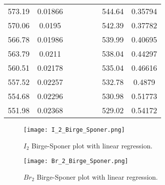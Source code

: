 \documentclass[letterpaper,12pt]{article}
\begin{document}
\begin{table}[!h]
\begin{tabular}{cccccccc}
\rowcolor[HTML]{EFEFEF} 
573.19                   & 0.01866                &                          &                          &                        &                          & 544.64                  & 0.35794                  \\
\rowcolor[HTML]{EFEFEF} 
570.06                   & 0.0195                 &                          &                          &                        &                          & 542.39                  & 0.37782                  \\
\rowcolor[HTML]{EFEFEF} 
566.78                   & 0.01986                &                          &                          &                        &                          & 539.99                  & 0.40695                  \\
\rowcolor[HTML]{EFEFEF} 
563.79                   & 0.0211                 &                          &                          &                        &                          & 538.04                  & 0.44297                  \\
\rowcolor[HTML]{EFEFEF} 
560.51                   & 0.02178                &                          &                          &                        &                          & 535.04                  & 0.46616                  \\
\rowcolor[HTML]{EFEFEF} 
557.52                   & 0.02257                &                          &                          &                        &                          & 532.78                  & 0.4879                   \\
\rowcolor[HTML]{EFEFEF} 
554.68                   & 0.02296                &                          &                          &                        &                          & 530.98                  & 0.51773                  \\
\rowcolor[HTML]{EFEFEF} 
551.98                   & 0.02368                &                          &                          &                        &                          & 529.02                  & 0.54172                 
\end{tabular}
\label{table 2}
\end{table}\clearpage
\begin{figure}[!h]
\centering
\texttt{[image: I\_2\_Birge\_Sponer.png]}
\caption{$I_2$ Birge-Sponer plot with linear regression.}
\label{figure 5}
\end{figure}
\begin{figure}[!h]
\centering
\texttt{[image: Br\_2\_Birge\_Sponer.png]}
\caption{$Br_2$ Birge-Sponer plot with linear regression.}
\label{figure 6}
\end{figure}
\end{document}
